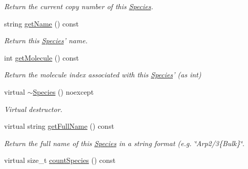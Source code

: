 \begin{DoxyCompactItemize}
\begin{DoxyCompactList}\small\item\em Return the current copy number of this \hyperlink{classSpecies}{Species}. \end{DoxyCompactList}\item 
string \hyperlink{classSpecies_a28fa239dded841133760ff9c47af63a1}{get\+Name} () const 
\begin{DoxyCompactList}\small\item\em Return this \hyperlink{classSpecies}{Species}' name. \end{DoxyCompactList}\item 
int \hyperlink{classSpecies_a1ea8969c51bc69879891a408f9e197c7}{get\+Molecule} () const 
\begin{DoxyCompactList}\small\item\em Return the molecule index associated with this \hyperlink{classSpecies}{Species}' (as int) \end{DoxyCompactList}\item 
virtual \hyperlink{classSpecies_ac2c46c7a238233581e70685900dbb970}{$\sim$\+Species} () noexcept
\begin{DoxyCompactList}\small\item\em Virtual destructor. \end{DoxyCompactList}\item 
virtual string \hyperlink{classSpecies_a00dab56705525cefef915aa29363a959}{get\+Full\+Name} () const 
\begin{DoxyCompactList}\small\item\em Return the full name of this \hyperlink{classSpecies}{Species} in a string format (e.\+g. \char`\"{}\+Arp2/3\{\+Bulk\}\char`\"{}. \end{DoxyCompactList}\item 
virtual size\+\_\+t \hyperlink{classSpecies_a1864e111fe0304ca8d6b2d0d955a7356}{count\+Species} () const 
\end{DoxyCompactItemize}
